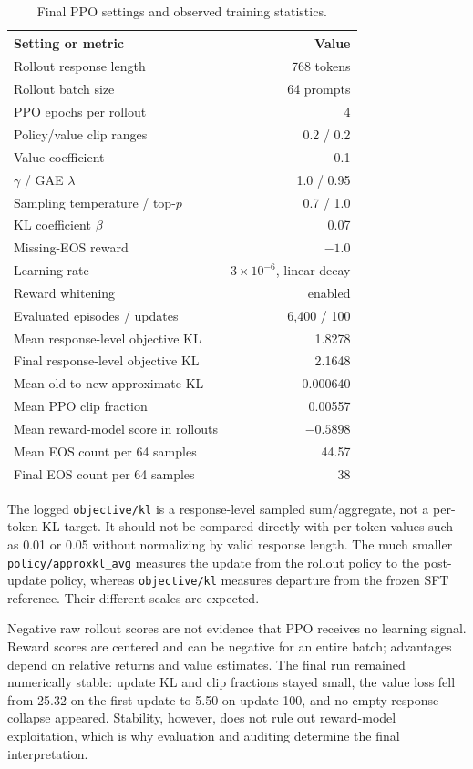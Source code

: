 \documentclass[11pt]{article}
\begin{document}
\begin{table}[H]
\centering
\caption{Final PPO settings and observed training statistics.}
\label{tab:ppo}
\begin{tabularx}{0.9\textwidth}{@{}Y r@{}}
\toprule
\textbf{Setting or metric} & \textbf{Value}\\
\midrule
Rollout response length & 768 tokens\\
Rollout batch size & 64 prompts\\
PPO epochs per rollout & 4\\
Policy/value clip ranges & 0.2 / 0.2\\
Value coefficient & 0.1\\
$\gamma$ / GAE $\lambda$ & 1.0 / 0.95\\
Sampling temperature / top-$p$ & 0.7 / 1.0\\
KL coefficient $\beta$ & 0.07\\
Missing-EOS reward & $-1.0$\\
Learning rate & $3\times 10^{-6}$, linear decay\\
Reward whitening & enabled\\
Evaluated episodes / updates & 6,400 / 100\\
Mean response-level objective KL & 1.8278\\
Final response-level objective KL & 2.1648\\
Mean old-to-new approximate KL & 0.000640\\
Mean PPO clip fraction & 0.00557\\
Mean reward-model score in rollouts & $-0.5898$\\
Mean EOS count per 64 samples & 44.57\\
Final EOS count per 64 samples & 38\\
\bottomrule
\end{tabularx}
\end{table}

The logged \texttt{objective/kl} is a response-level sampled sum/aggregate,
not a per-token KL target. It should not be compared directly with
per-token values such as 0.01 or 0.05 without normalizing by valid response
length. The much smaller \texttt{policy/approxkl\_avg} measures the update from
the rollout policy to the post-update policy, whereas
\texttt{objective/kl} measures departure from the frozen SFT reference. Their
different scales are expected.

Negative raw rollout scores are not evidence that PPO receives no learning
signal. Reward scores are centered and can be negative for an entire batch;
advantages depend on relative returns and value estimates. The final run
remained numerically stable: update KL and clip fractions stayed small, the
value loss fell from 25.32 on the first update to 5.50 on update 100, and no
empty-response collapse appeared. Stability, however, does not rule out
reward-model exploitation, which is why evaluation and auditing determine the
final interpretation.
\end{document}
